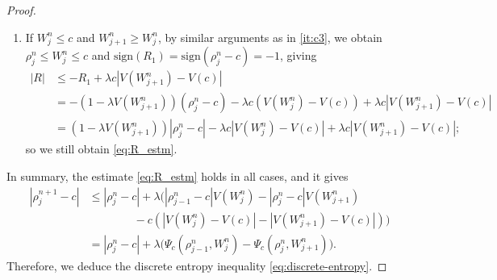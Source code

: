 \documentclass[10pt]{amsart}
\theoremstyle{plain}
\theoremstyle{definition}
\numberwithin{equation}{section}
\newcommand{\sgn}[1]{\mathrm{sign}\left(#1\right)}
\begin{document}
\begin{proof}
\begin{enumerate}[label={\uline{Case \arabic*.}}]
\item \label{it:c4} If $W_j^n \leq c$ and $W_{j+1}^n\geq W_j^n$, by similar arguments as in \cref{it:c3}, we obtain $\rho_j^n\leq W_j^n \leq c$ and $\sgn{R_1}=\sgn{\rho_j^n-c}=-1$, giving
\begin{align*}
    |R| &\leq -R_1  + \lambda c \left|V(W_{j+1}^n)-V(c)\right| \\
    &= -\left(1-\lambda V(W_{j+1}^n)\right) (\rho_j^n-c)  -\lambda c \left(V(W_j^n)-V(c)\right) + \lambda c \left|V(W_{j+1}^n)-V(c)\right| \\
    &= \left(1-\lambda V(W_{j+1}^n)\right) |\rho_j^n-c| - \lambda c \left|V(W_j^n)-V(c)\right| + \lambda c \left|V(W_{j+1}^n)-V(c)\right|;
\end{align*}
so we still obtain \cref{eq:R_estm}.
\end{enumerate}
In summary, the estimate \cref{eq:R_estm} holds in all cases, and it gives
\begin{align*}
    |\rho_j^{n+1}-c| & \leq |\rho_j^n-c| + \lambda \Big( |\rho_{j-1}^n-c| V(W_j^n) - |\rho_j^n-c|V(W_{j+1}^n) \\ &\qquad\qquad - c \left(\left|V(W_j^n)-V(c)\right| - \left|V(W_{j+1}^n)-V(c)\right|\right) \Big) \\
    &= |\rho_j^n-c| + \lambda \big(\Psi_c(\rho_{j-1}^n, W_j^n) - \Psi_c(\rho_j^n, W_{j+1}^n)\big).
\end{align*}
Therefore, we deduce the discrete entropy inequality \cref{eq:discrete-entropy}.
\end{proof}
\end{document}

